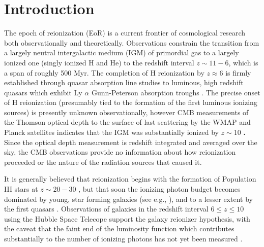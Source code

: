 
\section{Introduction}
\label{sec:introduction}

The epoch of reionization (EoR) is a current frontier of cosmological research both observationally and theoretically. 
Observations constrain the transition from a largely neutral intergalactic medium (IGM) of primordial gas to a largely ionized one 
(singly ionized H and He) to the redshift interval $z \sim 11-6$, which is a span of roughly 500 Myr. 
The completion of H reionization by $z \approx 6$ is firmly established through quasar absorption
line studies to luminous, high redshift quasars which exhibit Ly $\alpha$ Gunn-Peterson absorption troughs \citep{FanCarilliKeating2006}. 
The precise onset of H reionization (presumably tied to the formation of the first luminous ionizing sources) is presently unknown observationally, however CMB measurements of the Thomson optical depth 
to the surface of last scattering by the WMAP and Planck satellites indicates that the IGM was substantially ionized by $z\sim 10$ %
{\bf \citep{Spergel2003,Komatsu2009,JarosikEtAl2011,Planck2013}. }
Since the optical depth measurement is redshift integrated  and averaged over the sky, the CMB observations provide no information about how reionization proceeded or the nature of the radiation sources that caused it.

 It is generally believed that reionization begins with the formation of Population III stars at $z \sim 20-30$ \citep{ABN02,Yoshida03,BL04,Sokasian04}, but that soon the ionizing photon budget becomes dominated by young, star forming galaxies (see e.g., \cite{Wise12,Xu13}), and to a lesser extent by the first quasars {\bf \citep{MadauEtAl1999, BoltonHaehnelt2007, HaardtMadau2012, BeckerBolton2013} }. Observations of galaxies in the redshift interval $6 \leq z \leq 10$ using the Hubble Space Telecope support the galaxy reionizer hypothesis, with the caveat that the faint end of the luminosity function which contributes substantially to the number of ionizing photons has not yet been measured \citep{Robertson10,Bouwens12}. 

